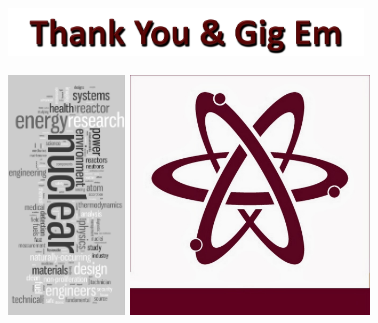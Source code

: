 \documentclass[8pt,xcolor=dvipnames]{beamer}
\begin{document}
\begin{frame}

\begin{figure}
\includegraphics[height=0.5in]{figures/thank_you.png}
\end{figure}

\begin{figure}
\includegraphics[height=2.5in]{figures/nuclear_collage.png}
\hspace{5mm}
\includegraphics[height=2.5in]{figures/tamu_atom.jpg}
\end{figure}

\end{frame}


\end{document}
